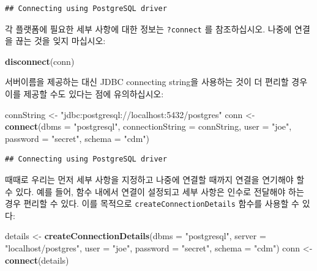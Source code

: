 \documentclass[11pt]{book}
\newenvironment{Shaded}{\begin{snugshade}}{\end{snugshade}}
\newcommand{\KeywordTok}[1]{\textcolor[rgb]{0.13,0.29,0.53}{\textbf{#1}}}
\newcommand{\DataTypeTok}[1]{\textcolor[rgb]{0.13,0.29,0.53}{#1}}
\newcommand{\StringTok}[1]{\textcolor[rgb]{0.31,0.60,0.02}{#1}}
\newcommand{\NormalTok}[1]{#1}
\theoremstyle{definition}
\theoremstyle{definition}
\theoremstyle{definition}
\theoremstyle{remark}
\begin{document}
\begin{verbatim}
## Connecting using PostgreSQL driver
\end{verbatim}

각 플랫폼에 필요한 세부 사항에 대한 정보는 \texttt{?connect} 를
참조하십시오. 나중에 연결을 끊는 것을 잊지 마십시오:

\begin{Shaded}
\begin{Highlighting}[]
\KeywordTok{disconnect}\NormalTok{(conn)}
\end{Highlighting}
\end{Shaded}

서버이름을 제공하는 대신 JDBC connecting string을 사용하는 것이 더
편리할 경우 이를 제공할 수도 있다는 점에 유의하십시오:

\begin{Shaded}
\begin{Highlighting}[]
\NormalTok{connString <-}\StringTok{ "jdbc:postgresql://localhost:5432/postgres"}
\NormalTok{conn <-}\StringTok{ }\KeywordTok{connect}\NormalTok{(}\DataTypeTok{dbms =} \StringTok{"postgresql"}\NormalTok{,}
                \DataTypeTok{connectionString =}\NormalTok{ connString,}
                \DataTypeTok{user =} \StringTok{"joe"}\NormalTok{,}
                \DataTypeTok{password =} \StringTok{"secret"}\NormalTok{,}
                \DataTypeTok{schema =} \StringTok{"cdm"}\NormalTok{)}
\end{Highlighting}
\end{Shaded}

\begin{verbatim}
## Connecting using PostgreSQL driver
\end{verbatim}

때때로 우리는 먼저 세부 사항을 지정하고 나중에 연결할 때까지 연결을
연기해야 할 수 있다. 예를 들어, 함수 내에서 연결이 설정되고 세부 사항은
인수로 전달해야 하는 경우 편리할 수 있다. 이를 목적으로
\texttt{createConnectionDetails} 함수를 사용할 수 있다:

\begin{Shaded}
\begin{Highlighting}[]
\NormalTok{details <-}\StringTok{ }\KeywordTok{createConnectionDetails}\NormalTok{(}\DataTypeTok{dbms =} \StringTok{"postgresql"}\NormalTok{,}
                                   \DataTypeTok{server =} \StringTok{"localhost/postgres"}\NormalTok{,}
                                   \DataTypeTok{user =} \StringTok{"joe"}\NormalTok{,}
                                   \DataTypeTok{password =} \StringTok{"secret"}\NormalTok{,}
                                   \DataTypeTok{schema =} \StringTok{"cdm"}\NormalTok{)}
\NormalTok{conn <-}\StringTok{ }\KeywordTok{connect}\NormalTok{(details)}
\end{Highlighting}
\end{Shaded}
\end{document}
